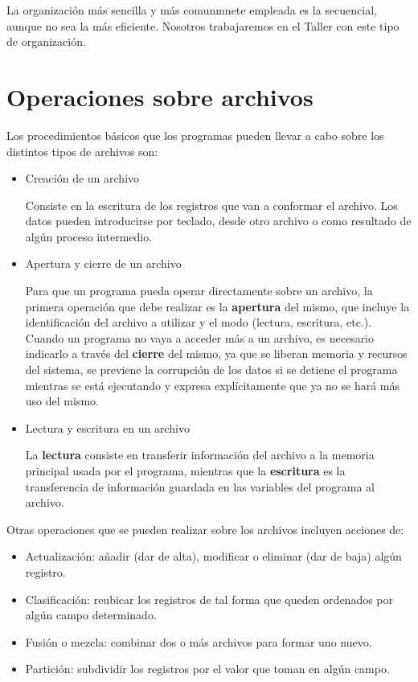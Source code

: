 \documentclass[]{book}
\providecommand{\tightlist}{%
  \setlength{\itemsep}{0pt}\setlength{\parskip}{0pt}}
\begin{document}
La organización más sencilla y más comunmnete empleada es la secuencial, aunque no sea la más eficiente. Nosotros trabajaremos en el Taller con este tipo de organización.

\hypertarget{operaciones-sobre-archivos}{%
\section{Operaciones sobre archivos}\label{operaciones-sobre-archivos}}

Los procedimientos básicos que los programas pueden llevar a cabo sobre los distintos tipos de archivos son:

\begin{itemize}
\item
  Creación de un archivo

  Consiste en la escritura de los registros que van a conformar el archivo. Los datos pueden introducirse por teclado, desde otro archivo o como resultado de algún proceso intermedio.
\item
  Apertura y cierre de un archivo

  Para que un programa pueda operar directamente sobre un archivo, la primera operación que debe realizar es la \textbf{apertura} del mismo, que incluye la identificación del archivo a utilizar y el modo (lectura, escritura, etc.). Cuando un programa no vaya a acceder más a un archivo, es necesario indicarlo a través del \textbf{cierre} del mismo, ya que se liberan memoria y recursos del sistema, se previene la corrupción de los datos si se detiene el programa mientras se está ejecutando y expresa explícitamente que ya no se hará más uso del mismo.
\item
  Lectura y escritura en un archivo

  La \textbf{lectura} consiste en transferir información del archivo a la memoria principal usada por el programa, mientras que la \textbf{escritura} es la transferencia de información guardada en las variables del programa al archivo.
\end{itemize}

Otras operaciones que se pueden realizar sobre los archivos incluyen acciones de:

\begin{itemize}
\tightlist
\item
  Actualización: añadir (dar de alta), modificar o eliminar (dar de baja) algún registro.
\item
  Clasificación: reubicar los registros de tal forma que queden ordenados por algún campo determinado.
\item
  Fusión o mezcla: combinar dos o más archivos para formar uno nuevo.
\item
  Partición: subdividir los registros por el valor que toman en algún campo.
\end{itemize}
\end{document}
